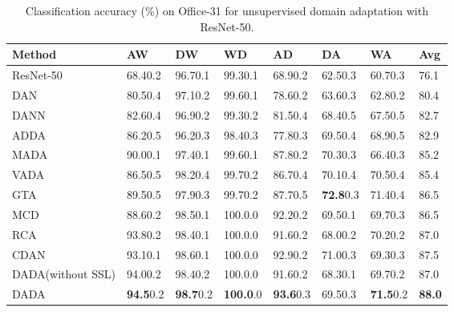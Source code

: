 \documentclass{ecai}
\begin{document}
\begin{table*}[!htbp]
\centering
\caption{Classification accuracy (\%) on Office-31 for unsupervised domain adaptation with ResNet-50.}
\begin{tabular}{p{3.0cm}p{1.4cm}<{\centering}p{1.4cm}<{\centering}p{1.4cm}<{\centering}p{1.4cm}<{\centering}p{1.4cm}<{\centering}p{1.4cm}<{\centering}p{1.4cm}<{\centering}}
\toprule
Method&   AW&   DW&   WD&   AD&   DA&   WA&  Avg\\
\midrule
ResNet-50\cite{b36}&  68.40.2&   96.70.1&   99.30.1&   68.90.2&   62.50.3&   60.70.3&   76.1\\
DAN\cite{b9}&  80.50.4&   97.10.2&   99.60.1&   78.60.2&   63.60.3&   62.80.2&   80.4\\
DANN\cite{b18}& 82.60.4&   96.90.2&   99.30.2&   81.50.4&   68.40.5&   67.50.5&   82.7\\
ADDA\cite{b33}& 86.20.5&   96.20.3&   98.40.3&   77.80.3&   69.50.4&   68.90.5&   82.9\\
MADA\cite{b13}& 90.00.1&   97.40.1&   99.60.1&   87.80.2&   70.30.3&   66.40.3&   85.2\\
VADA\cite{b40}& 86.50.5&   98.20.4&   99.70.2&   86.70.4&   70.10.4&   70.50.4&   85.4\\
GTA\cite{b39}&  89.50.5&   97.90.3&   99.70.2&   87.70.5&   \textbf{72.8}0.3&   71.40.4&   86.5\\
MCD\cite{b24}&  88.60.2&   98.50.1&   100.0.0&   92.20.2&   69.50.1&   69.70.3&   86.5\\
RCA\cite{b17}&  93.80.2&   98.40.1&   100.0.0&   91.60.2&   68.00.2&   70.20.2&   87.0\\
CDAN\cite{b34}& 93.10.1&   98.60.1&   100.0.0&   92.90.2&   71.00.3&   69.30.3&   87.5\\
\midrule
DADA(without SSL)& 94.00.2&  98.40.2&  100.0.0&   91.60.2&  68.30.1&   69.70.2&   87.0 \\
DADA&        \textbf{94.5}0.2&   \textbf{98.7}0.2&   \textbf{100.0}.0&   \textbf{93.6}0.3&   69.50.3&   \textbf{71.5}0.2&   \textbf{88.0}\\
\bottomrule
\end{tabular}
\label{res_1}
\end{table*}
\end{document}
